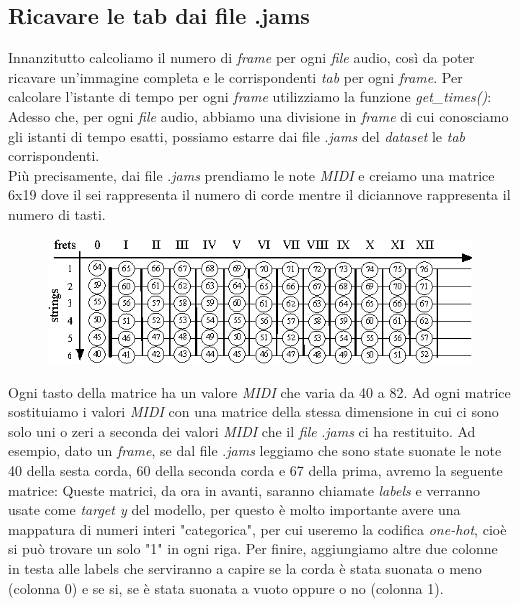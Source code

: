 \subsection{Ricavare le tab dai file .jams}
Innanzitutto calcoliamo il numero di \textit{frame} per ogni \textit{file} audio, così da poter ricavare un'immagine completa e le corrispondenti \textit{tab} per ogni \textit{frame}. Per calcolare l'istante di tempo per ogni \textit{frame} utilizziamo la funzione \textit{get\_times()}:
\vspace*{2ex}
\vspace*{2ex}
\noindent Adesso che, per ogni \textit{file} audio, abbiamo una divisione in \textit{frame} di cui conosciamo gli istanti di tempo esatti, possiamo estarre dai file .\textit{jams} del \textit{dataset} le \textit{tab} corrispondenti.\\ Più precisamente, dai file .\textit{jams} prendiamo le note \textit{MIDI} e creiamo una matrice 6x19 dove il sei rappresenta il numero di corde mentre il diciannove rappresenta il numero di tasti.
\begin{figure}[H]
	\centering
	\includegraphics[scale=0.65]{./images/img11.png}
\end{figure}
\noindent Ogni tasto della matrice ha un valore \textit{MIDI} che varia da 40 a 82.
\vspace*{2ex}
\vspace*{2ex}
\noindent Ad ogni matrice sostituiamo i valori \textit{MIDI} con una matrice della stessa dimensione in cui ci sono solo uni o zeri a seconda dei valori \textit{MIDI} che il \textit{file} .\textit{jams} ci ha restituito. Ad esempio, dato un \textit{frame}, se dal file .\textit{jams} leggiamo che sono state suonate le note 40 della sesta corda, 60 della seconda corda e 67 della prima, avremo la seguente matrice:
\vspace*{2ex}
\vspace*{2ex}
\noindent Queste matrici, da ora in avanti, saranno chiamate \textit{labels} e verranno usate come \textit{target y} del modello, per questo è molto importante avere una mappatura di numeri interi "categorica", per cui useremo la codifica \textit{one-hot}, cioè si può trovare un solo "1" in ogni riga. Per finire, aggiungiamo altre due colonne in testa alle labels che serviranno a capire se la corda è stata suonata o meno (colonna 0) e se si, se è stata suonata a vuoto oppure o no (colonna 1).\\
